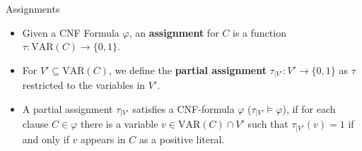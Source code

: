 \begin{frame}[t]{Assignments}
	\begin{itemize}[<+->]
		\item Given a CNF Formula $\varphi$, an \textbf{assignment} for $C$ is a function $\tau : \mathrm{VAR}(C) \rightarrow \{0, 1\}$.
		\item For $V' \subseteq \mathrm{VAR}(C)$, we define the \textbf{partial assignment} $\tau_{|V'} : V' \rightarrow \{0, 1\}$ as $\tau$ restricted to the variables in $V'$.
		\item A partial assignment $\tau_{|V'}$ satisfies a CNF-formula $\varphi$ ($\tau_{|V'} \models \varphi$), if for each clause $C \in \varphi$ there is a variable $v \in \mathrm{VAR}(C) \cap V'$ such that $\tau_{|V'}(v) = 1$ if and only if $v$ appears in $C$ as a positive literal.

	\end{itemize}
\end{frame}

